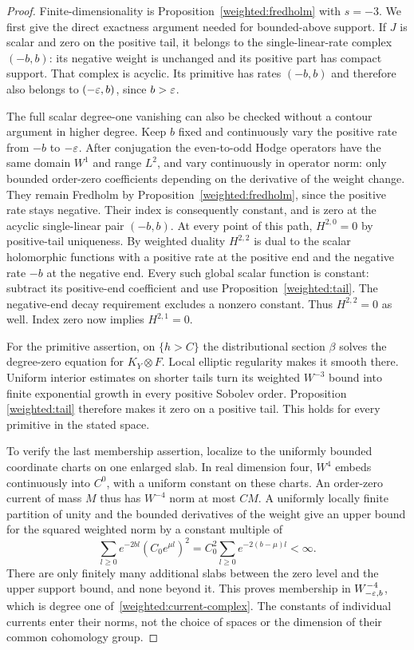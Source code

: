 \begin{proof}
Finite-dimensionality is Proposition~\ref{weighted:fredholm} with
$s=-3$. We first give the direct exactness argument needed for
bounded-above support. If $J$ is scalar and zero on the positive tail,
it belongs to the single-linear-rate complex $(-b,b)$: its negative
weight is unchanged and its positive part has compact support. That
complex is acyclic. Its primitive has rates $(-b,b)$ and therefore also
belongs to $(-\varepsilon,b)$, since $b>\varepsilon$.

The full scalar degree-one vanishing can also be checked without a
contour argument in higher degree. Keep $b$ fixed and continuously vary
the positive rate from $-b$ to $-\varepsilon$. After conjugation the even-to-odd
Hodge operators have the same domain $W^1$ and range $L^2$, and vary
continuously in operator norm: only bounded order-zero coefficients
depending on the derivative of the weight change. They remain
Fredholm by Proposition~\ref{weighted:fredholm}, since the positive
rate stays negative. Their index is consequently constant, and is
zero at the acyclic single-linear pair $(-b,b)$. At every point of
this path, $H^{2,0}=0$ by positive-tail uniqueness. By weighted duality
$H^{2,2}$ is dual to the scalar holomorphic functions with a positive
rate at the positive end and the negative rate $-b$ at the negative
end. Every such global scalar function is constant: subtract its
positive-end coefficient and use Proposition~\ref{weighted:tail}.
The negative-end decay requirement excludes a nonzero constant.
Thus $H^{2,2}=0$ as well. Index zero now implies $H^{2,1}=0$.

For the primitive assertion, on $\{h>C\}$ the distributional section
$\beta$ solves the degree-zero equation for $K_Y\otimes F$. Local
elliptic regularity makes it smooth there. Uniform interior estimates
on shorter tails turn its weighted $W^{-3}$ bound into finite
exponential growth in every positive Sobolev order. Proposition
\ref{weighted:tail} therefore makes it zero on a positive tail. This
holds for every primitive in the stated space.

To verify the last membership assertion, localize to the uniformly
bounded coordinate charts on one enlarged slab. In real dimension
four, $W^4$ embeds continuously into $C^0$, with a uniform constant on
these charts. An order-zero current of mass $M$ thus has $W^{-4}$ norm
at most $CM$. A uniformly locally finite partition of unity and the
bounded derivatives of the weight give an upper bound for the squared
weighted norm by a constant multiple of
\[
 \sum_{l\ge0} e^{-2bl}(C_0e^{\mu l})^2
 =C_0^2\sum_{l\ge0}e^{-2(b-\mu)l}<\infty.
\]
There are only finitely many additional slabs between the zero level
and the upper support bound, and none beyond it. This proves
membership in $W^{-4}_{-\varepsilon,b}$, which is degree one
of~\eqref{weighted:current-complex}. The constants of individual
currents enter their norms, not the choice of spaces or the dimension
of their common cohomology group.
\end{proof}

